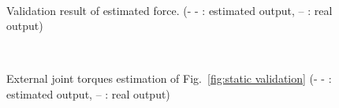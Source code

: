 \documentclass[letterpaper, 10 pt, conference]{ieeeconf}
\newcommand{\fref}[1]{Fig.~\ref{#1}}
\begin{document}
\begin{figure}
  \centering
  \,
  \,
  \caption{Validation result of estimated force. (- - : estimated output, -- : real output)}
  \label{fig:validation}
\end{figure}

\begin{figure}
  \centering
  \,
  \,
  \caption{External joint torques estimation of \fref{fig:static validation} (- - : estimated output, -- : real output)}
  \label{fig:torque validation}
\end{figure}
\end{document}
